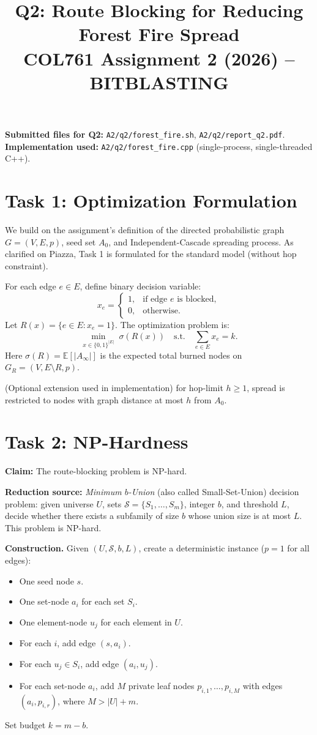 \documentclass[9pt,a4paper]{article}
\title{\textbf{Q2: Route Blocking for Reducing Forest Fire Spread}\\
COL761 Assignment 2 (2026) -- BITBLASTING}
\author{}
\date{}
\begin{document}
\maketitle
\vspace{-1.2em}

\textbf{Submitted files for Q2:} \texttt{A2/q2/forest\_fire.sh}, \texttt{A2/q2/report\_q2.pdf}.\\
\textbf{Implementation used:} \texttt{A2/q2/forest\_fire.cpp} (single-process, single-threaded C++).

\section*{Task 1: Optimization Formulation}
We build on the assignment's definition of the directed probabilistic graph
$G=(V,E,p)$, seed set $A_0$, and Independent-Cascade spreading process.
As clarified on Piazza, Task 1 is formulated for the standard model
(without hop constraint).

For each edge $e\in E$, define binary decision variable:
\[
 x_e =
 \begin{cases}
 1,&\text{if edge }e\text{ is blocked},\\
 0,&\text{otherwise.}
 \end{cases}
\]
Let $R(x)=\{e\in E:x_e=1\}$. The optimization problem is:
\[
\min_{x\in\{0,1\}^{|E|}}\; \sigma(R(x))
\quad\text{s.t.}\quad
\sum_{e\in E} x_e = k.
\]
Here $\sigma(R)=\mathbb{E}[|A_\infty|]$ is the expected total burned nodes on
$G_R=(V,E\setminus R,p)$.

(Optional extension used in implementation) for hop-limit $h\ge 1$, spread is
restricted to nodes with graph distance at most $h$ from $A_0$.

\section*{Task 2: NP-Hardness}
\textbf{Claim:} The route-blocking problem is NP-hard.

\textbf{Reduction source:} \emph{Minimum $b$-Union} (also called Small-Set-Union)
decision problem: given universe $U$, sets $\mathcal{S}=\{S_1,\dots,S_m\}$,
integer $b$, and threshold $L$, decide whether there exists a subfamily of size
$b$ whose union size is at most $L$. This problem is NP-hard.

\textbf{Construction.}
Given $(U,\mathcal{S},b,L)$, create a deterministic instance ($p=1$ for all edges):
\begin{itemize}
\item One seed node $s$.
\item One set-node $a_i$ for each set $S_i$.
\item One element-node $u_j$ for each element in $U$.
\item For each $i$, add edge $(s,a_i)$.
\item For each $u_j\in S_i$, add edge $(a_i,u_j)$.
\item For each set-node $a_i$, add $M$ private leaf nodes
      $p_{i,1},\dots,p_{i,M}$ with edges $(a_i,p_{i,r})$, where
      $M>|U|+m$.
\end{itemize}
Set budget $k=m-b$.
\end{document}
